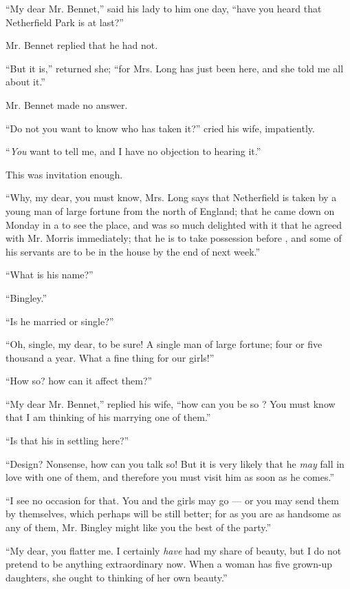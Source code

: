\documentclass{fiche}
\begin{document}
\begin{texte}
``My dear Mr. Bennet,'' said his lady to him one day, ``have you heard that Netherfield Park
is  at last?''

Mr. Bennet replied that he had not.

``But it is,'' returned she; ``for Mrs. Long has just been here, and she told me all about
it.''

Mr. Bennet made no answer.

``Do not you want to know who has taken it?'' cried his wife, impatiently.

``\emph{You} want to tell me, and I have no objection to hearing it.''

This was invitation enough.

``Why, my dear, you must know, Mrs. Long says that Netherfield is taken by a young man of
large fortune from the north of England; that he came down on Monday in a
 to see the place, and
was so much delighted with it that he agreed with Mr. Morris immediately; that he is to take
possession before , and some of
his servants are to be in the house by the end of next week.''

``What is his name?''

``Bingley.''

``Is he married or single?''

``Oh, single, my dear, to be sure! A single man of large fortune; four or five thousand a
year. What a fine thing for our girls!''

``How so? how can it affect them?''

``My dear Mr. Bennet,'' replied his wife, ``how can you be so
? You must know that I am thinking of his marrying one of
them.''

``Is that his  in settling here?''

``Design? Nonsense, how can you talk so! But it is very likely that he \emph{may} fall in love
with one of them, and therefore you must visit him as soon as he comes.''

``I see no occasion for that. You and the girls may go --- or you may send them by themselves,
which perhaps will be still better; for as you are as handsome as any of them, Mr. Bingley
might like you the best of the party.''

``My dear, you flatter me. I certainly \emph{have} had my share of beauty, but I do not
pretend to be anything extraordinary now. When a woman has five grown-up daughters, she ought
to  thinking of her own beauty.''


\end{texte}
\end{document}
